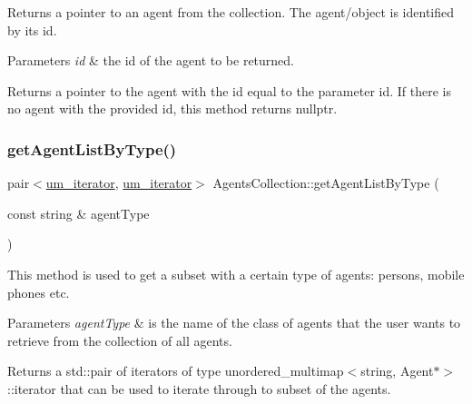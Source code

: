 Returns a pointer to an agent from the collection. The agent/object is identified by its id. 
\begin{DoxyParams}{Parameters}
{\em id} & the id of the agent to be returned. \\
\hline
\end{DoxyParams}
\begin{DoxyReturn}{Returns}
a pointer to the agent with the id equal to the parameter id. If there is no agent with the provided id, this method returns nullptr. 
\end{DoxyReturn}
\mbox{\label{class_agents_collection_a4ab0c8e86e6f6ebceb12bd2bd8f9f758}} 
\subsubsection{\texorpdfstring{get\+Agent\+List\+By\+Type()}{getAgentListByType()}}
{\footnotesize\ttfamily pair$<$\hyperlink{_agents_collection_8h_afde47bc45d604b8b8c72755072376679}{um\+\_\+iterator}, \hyperlink{_agents_collection_8h_afde47bc45d604b8b8c72755072376679}{um\+\_\+iterator}$>$ Agents\+Collection\+::get\+Agent\+List\+By\+Type (\begin{DoxyParamCaption}\item[{const string \&}]{agent\+Type }\end{DoxyParamCaption})}

This method is used to get a subset with a certain type of agents\+: persons, mobile phones etc. 
\begin{DoxyParams}{Parameters}
{\em agent\+Type} & is the name of the class of agents that the user wants to retrieve from the collection of all agents. \\
\hline
\end{DoxyParams}
\begin{DoxyReturn}{Returns}
a std\+::pair of iterators of type unordered\+\_\+multimap$<$string, Agent$\ast$$>$\+::iterator that can be used to iterate through to subset of the agents. 
\end{DoxyReturn}
\mbox{\label{class_agents_collection_a193faf9793030715e8edeb65137156e9}} 
